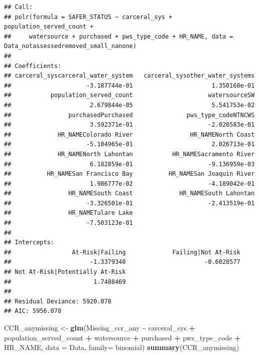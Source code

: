 \documentclass[
]{article}
\newenvironment{Shaded}{\begin{snugshade}}{\end{snugshade}}
\newcommand{\AttributeTok}[1]{\textcolor[rgb]{0.13,0.29,0.53}{#1}}
\newcommand{\FunctionTok}[1]{\textcolor[rgb]{0.13,0.29,0.53}{\textbf{#1}}}
\newcommand{\NormalTok}[1]{#1}
\newcommand{\OtherTok}[1]{\textcolor[rgb]{0.56,0.35,0.01}{#1}}
\newcommand{\SpecialCharTok}[1]{\textcolor[rgb]{0.81,0.36,0.00}{\textbf{#1}}}
\begin{document}
\begin{verbatim}
## Call:
## polr(formula = SAFER_STATUS ~ carceral_sys + population_served_count + 
##     watersource + purchased + pws_type_code + HR_NAME, data = Data_notassessedremoved_small_nanone)
## 
## Coefficients:
## carceral_syscarceral_water_system   carceral_sysother_water_systems 
##                     -3.187744e-01                      1.350168e-01 
##           population_served_count                     watersourceSW 
##                      2.679844e-05                      5.541753e-02 
##                purchasedPurchased               pws_type_codeNTNCWS 
##                      3.592371e-01                     -2.020583e-01 
##             HR_NAMEColorado River                HR_NAMENorth Coast 
##                     -5.104965e-01                      2.026713e-01 
##             HR_NAMENorth Lahontan           HR_NAMESacramento River 
##                      6.182859e-01                     -9.136959e-03 
##          HR_NAMESan Francisco Bay          HR_NAMESan Joaquin River 
##                      1.986777e-02                     -4.189042e-01 
##                HR_NAMESouth Coast             HR_NAMESouth Lahontan 
##                     -3.326501e-01                     -2.413519e-01 
##                HR_NAMETulare Lake 
##                     -7.503123e-01 
## 
## Intercepts:
##                 At-Risk|Failing             Failing|Not At-Risk 
##                      -1.3379340                      -0.6028577 
## Not At-Risk|Potentially At-Risk 
##                       1.7488469 
## 
## Residual Deviance: 5920.078 
## AIC: 5956.078
\end{verbatim}

\begin{Shaded}
\begin{Highlighting}[]
\NormalTok{CCR\_anymissing }\OtherTok{\textless{}{-}} \FunctionTok{glm}\NormalTok{(Missing\_ccr\_any }\SpecialCharTok{\textasciitilde{}}\NormalTok{ carceral\_sys }\SpecialCharTok{+}\NormalTok{ population\_served\_count }\SpecialCharTok{+}\NormalTok{ watersource }\SpecialCharTok{+}\NormalTok{ purchased }\SpecialCharTok{+}\NormalTok{ pws\_type\_code }\SpecialCharTok{+}\NormalTok{ HR\_NAME, }\AttributeTok{data =}\NormalTok{ Data, }\AttributeTok{family=}\NormalTok{ binomial)}
\FunctionTok{summary}\NormalTok{(CCR\_anymissing)}
\end{Highlighting}
\end{Shaded}
\end{document}
